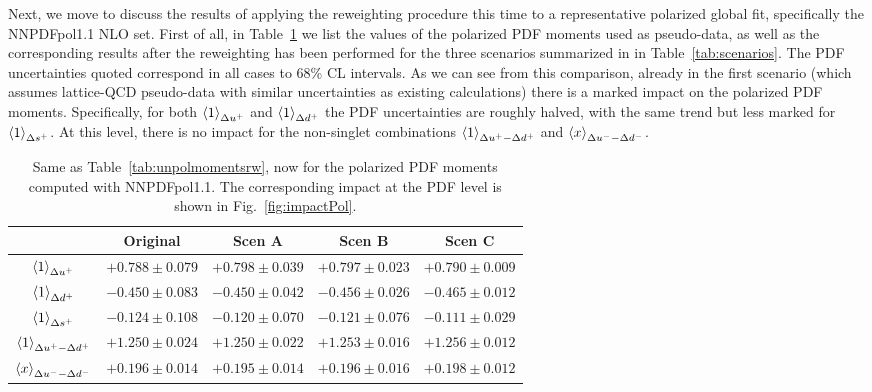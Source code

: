 Next, we move to discuss the results of applying the
reweighting procedure this time to a representative polarized
global fit, specifically the NNPDFpol1.1 NLO set.
%
First of all, in Table~\ref{tab:polmomentsrw}
we list the values of the polarized PDF moments
  used as pseudo-data, as well as the corresponding results
  after the reweighting has been performed for the
three scenarios summarized in 
in Table~\ref{tab:scenarios}.
%
The PDF uncertainties quoted correspond in all cases to 68\%
CL intervals.
%
As we can see from this comparison, already in the first scenario
(which assumes lattice-QCD pseudo-data with similar uncertainties
as existing calculations) there is a marked impact on the
polarized PDF moments.
%
Specifically, for both $\left\langle 1\right\rangle_{\Delta u^+}$ and $\left\langle 1\right\rangle_{\Delta d^+}$
the PDF uncertainties are roughly halved, with the same
trend but less marked for $\left\langle 1\right\rangle_{\Delta s^+}$.
%
At this level, there is no impact for the non-singlet
combinations $\left\langle 1\right\rangle_{\Delta u^+ - \Delta d^+}$
and $\left\langle x\right\rangle_{\Delta u^--\Delta d^-}$.

\begin{table}[t]
  \centering
  \renewcommand{\arraystretch}{1.3} 
\begin{tabular}{c||c||c|c|c}
  \hline &  Original  & Scen A  &  Scen B  & Scen C  \\
  \hline
  $\left\langle 1\right\rangle_{\Delta u^+}$    &  $+0.788\pm  0.079$   & $+0.798\pm  0.039$     &
  $+0.797\pm  0.023$ &   $+0.790\pm  0.009$ \\
  $\left\langle 1\right\rangle_{\Delta d^+}$   &  $-0.450 \pm 0.083$  &  $-0.450 \pm 0.042$  &
  $-0.456 \pm 0.026$    &  $-0.465 \pm 0.012$   \\
  $\left\langle 1\right\rangle_{\Delta s^+}$    &  $-0.124\pm   0.108 $  & $-0.120\pm   0.070 $  &
  $-0.121\pm   0.076 $    &   $-0.111\pm   0.029 $  \\
  $\left\langle 1\right\rangle_{\Delta u^+ - \Delta d^+}$  & $+1.250 \pm 0.024$   & $+1.250 \pm 0.022$  &
  $+1.253 \pm 0.016$ &    $+1.256 \pm 0.012$  \\
  $\left\langle x\right\rangle_{\Delta u^--\Delta d^-}$     & $+0.196 \pm 0.014$    & $+0.195 \pm 0.014$
  & $+0.196 \pm 0.016$     &  $+0.198 \pm 0.012$    \\
  \hline
\end{tabular}
\caption{\small Same as Table~\ref{tab:unpolmomentsrw}, now for
  the polarized PDF moments computed with NNPDFpol1.1.
  The corresponding impact at the PDF level is shown in
  Fig.~\ref{fig:impactPol}.
\label{tab:polmomentsrw}
}
\end{table}

